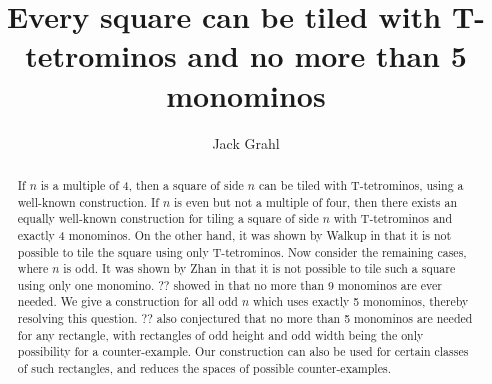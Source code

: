 \documentclass{article}
\title{Every square can be tiled with T-tetrominos and no more than 5 monominos}
\author{Jack Grahl}
\begin{document}
\maketitle

\begin{abstract}
If $n$ is a multiple of 4, then a square of side $n$ can be tiled with T-tetrominos, using a well-known construction.
If $n$ is even but not a multiple of four, then there exists an equally well-known construction for tiling a square of side $n$ with T-tetrominos and exactly 4 monominos.
On the other hand, it was shown by Walkup in \cite{walkup} that it is not possible to tile the square using only T-tetrominos.
Now consider the remaining cases, where $n$ is odd.
It was shown by Zhan in \cite{zhan} that it is not possible to tile such a square using only one monomino.
?? showed in \cite{??} that no more than 9 monominos are ever needed.
We give a construction for all odd $n$ which uses exactly 5 monominos, thereby resolving this question.
?? also conjectured that no more than 5 monominos are needed for any rectangle, with rectangles of odd height and odd width being the only possibility for a counter-example.
Our construction can also be used for certain classes of such rectangles, and reduces the spaces of possible counter-examples.
\end{abstract}
{}

\end{document}
